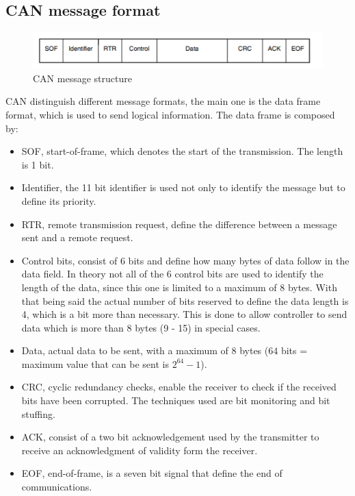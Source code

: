 \documentclass[../main.tex]{subfiles}
\begin{document}
\subsection{CAN message format}
\begin{figure}[H]
    \centering
    \includegraphics[width=\linewidth]{images_folder/can message.png}
    \caption{CAN message structure}
    \label{fig:CANMSG}
\end{figure}
\gls{CAN} distinguish different message formats, the main one is the data frame format, which is used to send logical information. The data frame is composed by:
\begin{itemize}
    \item \gls{SOF}, start-of-frame, which denotes the start of the transmission. The length is 1 bit. 
    \item Identifier, the 11 bit identifier is used not only to identify the message but to define its priority. 
    \item \gls{RTR}, remote transmission request, define the difference between a message sent and a remote request. 
    \item Control bits, consist of 6 bits and define how many bytes of data follow in the data field. In theory not all of the 6 control bits are used to identify the length of the data, since this one is limited to a maximum of 8 bytes. With that being said the actual number of bits reserved to define the data length is 4, which is a bit more than necessary. This is done to allow controller to send data which is more than 8 bytes (9 - 15) in special cases.
    \item Data, actual data to be sent, with a maximum of 8 bytes ($64$ bits = maximum value that can be sent is $2^{64} - 1$).
    \item \gls{CRC}, cyclic redundancy checks, enable the receiver to check if the received bits have been corrupted. The techniques used are bit monitoring and bit stuffing.
    \item \gls{ACK}, consist of a two bit acknowledgement used by the transmitter to receive an acknowledgment of validity form the receiver.
    \item \gls{EOF}, end-of-frame, is a seven bit signal that define the end of communications. 
\end{itemize}
\end{document}
